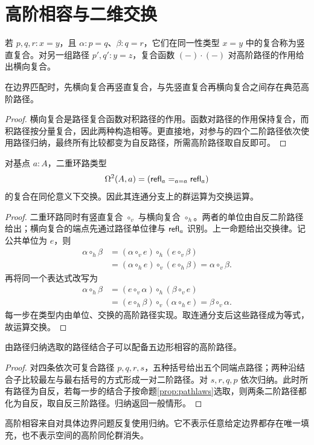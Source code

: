 \section{高阶相容与二维交换}
\begin{definition}[二阶路径的复合]
若 $p,q,r:x=y$，且 $\alpha:p=q$、$\beta:q=r$，它们在同一性类型 $x=y$ 中的复合称为竖直复合。对另一组路径 $p',q':y=z$，复合函数 $(-)\cdot(-)$ 对高阶路径的作用给出横向复合。
\end{definition}
\begin{proposition}[交换律]
在边界匹配时，先横向复合再竖直复合，与先竖直复合再横向复合之间存在典范高阶路径。
\end{proposition}
\begin{proof}
横向复合是路径复合函数对积路径的作用。函数对路径的作用保持复合，而积路径按分量复合，因此两种构造相等。更直接地，对参与的四个二阶路径依次使用路径归纳，最终所有比较都变为自反路径，所需高阶路径取自反即可。
\end{proof}
\begin{theorem}
对基点 $a:A$，二重环路类型
\[
\Omega^2(A,a)=(\mathsf{refl}_a=_{a=a}\mathsf{refl}_a)
\]
的复合在同伦意义下交换。因此其连通分支上的群运算为交换运算。
\end{theorem}
\begin{proof}
二重环路同时有竖直复合 $\circ_v$ 与横向复合 $\circ_h$。两者的单位由自反二阶路径给出；横向复合的端点先通过路径单位律与 $\mathsf{refl}_a$ 识别。上一命题给出交换律。记公共单位为 $e$，则
\begin{align*}
\alpha\circ_h\beta
&=(\alpha\circ_ve)\circ_h(e\circ_v\beta)\\
&=(\alpha\circ_he)\circ_v(e\circ_h\beta)
=\alpha\circ_v\beta.
\end{align*}
再将同一个表达式改写为
\begin{align*}
\alpha\circ_h\beta
&=(e\circ_v\alpha)\circ_h(\beta\circ_ve)\\
&=(e\circ_h\beta)\circ_v(\alpha\circ_he)
=\beta\circ_v\alpha.
\end{align*}
每一步在类型内由单位、交换的高阶路径实现。取连通分支后这些路径成为等式，故运算交换。
\end{proof}
\begin{proposition}[结合子的五边形相容]
由路径归纳选取的路径结合子可以配备五边形相容的高阶路径。
\end{proposition}
\begin{proof}
对四条依次可复合路径 $p,q,r,s$，五种括号给出五个同端点路径；两种沿结合子比较最左与最右括号的方式形成一对二阶路径。对 $s,r,q,p$ 依次归纳。此时所有路径为自反，若每一步的结合子按命题\ref{prop:pathlaws}选取，则两条二阶路径都化为自反，取自反三阶路径。归纳返回一般情形。
\end{proof}
\begin{remark}
高阶相容来自对具体边界问题反复使用归纳。它不表示任意给定边界都存在唯一填充，也不表示空间的高阶同伦群消失。
\end{remark}

